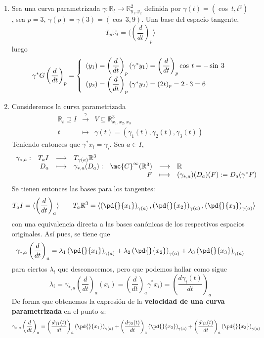 \begin{eje}
    \begin{enumerate}
        \item Sea una curva parametrizada $\gamma: \mathbb{R}_t \longrightarrow \mathbb{R}^2_{y_1, y_2}$ definida por $\gamma(t)=(\cos \: t, t^2)$, sea $p=3$, $\gamma(p)=\gamma(3)=(\cos \: 3, 9)$. Una base del espacio tangente,  $$T_p\mathbb{R}_t=\langle \left(\dfrac{d}{dt}\right)_p \rangle$$ 
        luego
        $$\gamma^*G\left( \dfrac{d}{dt}\right)_p = \left\{ \begin{array}{l}
             (y_1)= \left( \dfrac{d}{dt}\right)_p(\gamma^*y_1) =\left( \dfrac{d}{dt}\right)_p \cos \: t= - \sin \: 3  \\
             \vspace{-4mm}\\
             (y_2)  = \left( \dfrac{d}{dt}\right)_p(\gamma^*y_2)= (2t)_p = 2 \cdot 3 =6 
        \end{array}\right. $$
        \item Consideremos la curva parametrizada 
        $$\begin{array}{rcl}
            \mathbb{R}_t \supseteq I & \overset{\gamma}{\longrightarrow} & V \subseteq \mathbb{R}^3_{x_1, x_2, x_3}  \\
            t & \longmapsto & \gamma(t)=(\gamma_1(t), \gamma_2(t), \gamma_3(t)) 
        \end{array}$$
        Teniendo entonces que $\gamma^* x_i=\gamma_i$. Sea $a \in I$, 
        $$\begin{array}{rrclrll}
            \gamma_{*,a} : & T_aI & \longrightarrow & T_{\gamma(a)}\mathbb R^3  \\
            & D_a & \longmapsto & \gamma_{*,a}(D_a):&  \mc{C}^{\infty}(\mathbb R^3) & \longrightarrow & \mathbb{R} \\
                 & & & & F & \longmapsto &  (\gamma_{*,a})(D_a)(F):=D_a(\gamma^*F)
\end{array} $$
Se tienen entonces las bases para los tangentes:
$$T_aI=\langle \left(\dfrac{d}{dt}\right)_a \rangle \qquad T_a\mathbb{R}^3=\langle \left(\pd{}{x_1}\right)_{\gamma(a)}, \left(\pd{}{x_2}\right)_{\gamma(a)}, \left(\pd{}{x_3}\right)_{\gamma(a)} \rangle$$
con una equivalencia directa a las bases can{\'o}nicas de los respectivos espacios originales. As{\'i} pues, se tiene que 
$$\gamma_{*,a}\left(\dfrac{d}{dt}\right)_a=\lambda_1 \left( \pd{}{x_1}\right)_{\gamma(a)} +\lambda_2 \left( \pd{}{x_2}\right)_{\gamma(a)}+\lambda_3 \left( \pd{}{x_3}\right)_{\gamma(a)}$$
para ciertos $\lambda_i$ que desconocemos, pero que podemos hallar como sigue
$$\lambda_i=\gamma_{*,a} \left( \dfrac{d}{dt}\right)_a (x_i)= \left( \dfrac{d}{dt}\right)_a \gamma^* x_i)=\left(\dfrac{d\gamma_i(t)}{dt}\right)_a$$
De  forma que obtenemos la expresi{\'o}n de la \textbf{velocidad de una curva parametrizada} en el punto $a$:
$$\gamma_{*,a}\left(\dfrac{d}{dt}\right)_a=\left(\dfrac{d\gamma_1(t)}{dt}\right)_a \left( \pd{}{x_1}\right)_{\gamma(a)} +\left(\dfrac{d\gamma_2(t)}{dt}\right)_a \left( \pd{}{x_2}\right)_{\gamma(a)}+\left(\dfrac{d\gamma_3(t)}{dt}\right)_a\left( \pd{}{x_3}\right)_{\gamma(a)}$$
    \end{enumerate}
\end{eje}
